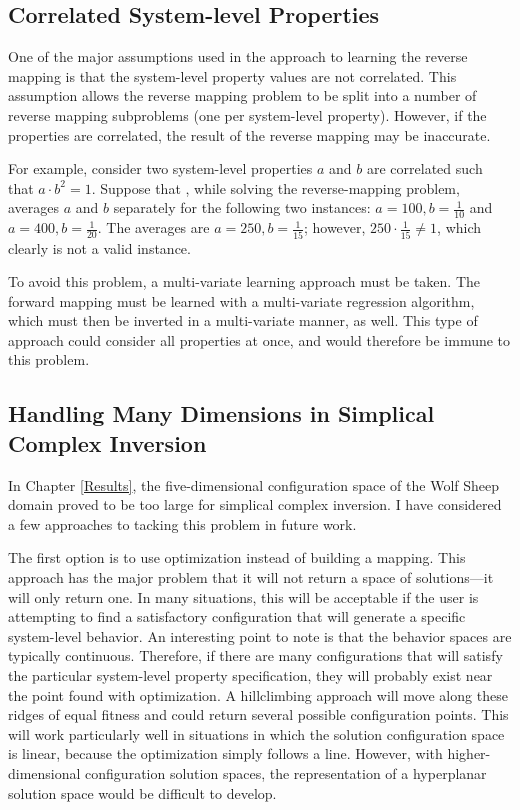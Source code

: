 \subsection{Correlated System-level Properties}

One of the major assumptions used in the \fw approach to learning the reverse mapping is that the system-level property values are not correlated.
This assumption allows the reverse mapping problem to be split into a number of reverse mapping subproblems (one per system-level property).
However, if the properties are correlated, the result of the reverse mapping may be inaccurate.

For example, consider two system-level properties $a$ and $b$ are correlated such that $a \cdot b^2 = 1$.
Suppose that \fw, while solving the reverse-mapping problem, averages $a$ and $b$ separately for the following two instances: $a=100, b=\frac{1}{10}$ and $a=400, b=\frac{1}{20}$.
The averages are $a=250, b=\frac{1}{15}$; however, $250 \cdot \frac{1}{15} \neq 1$, which clearly is not a valid instance.

To avoid this problem, a multi-variate learning approach must be taken.
The forward mapping must be learned with a multi-variate regression algorithm, which must then be inverted in a multi-variate manner, as well.
This type of approach could consider all properties at once, and would therefore be immune to this problem.



\subsection{Handling Many Dimensions in Simplical Complex Inversion}

In Chapter \ref{Results}, the five-dimensional configuration space of the Wolf Sheep domain proved to be too large for simplical complex inversion.
I have considered a few approaches to tacking this problem in future work.

The first option is to use optimization instead of building a mapping.
This approach has the major problem that it will not return a space of solutions---it will only return one.
In many situations, this will be acceptable if the user is attempting to find a satisfactory configuration that will generate a specific system-level behavior.
An interesting point to note is that the behavior spaces are typically continuous.
Therefore, if there are many configurations that will satisfy the particular system-level property specification, they will probably exist near the point found with optimization.
A hillclimbing approach will move along these ridges of equal fitness and could return several possible configuration points.
This will work particularly well in situations in which the solution configuration space is linear, because the optimization simply follows a line.
However, with higher-dimensional configuration solution spaces, the representation of a hyperplanar solution space would be difficult to develop. 

